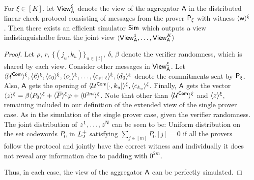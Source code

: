 \begin{lemma}\label{lem:distlincheckzk}
	For $\xi\in [K]$, let $\mathsf{View}^\xi_{\mathsf{A}}$ denote the view of the aggregator $\mathsf{A}$ in the distributed
	linear check protocol consisting of messages from the prover $\mathsf{P}_\xi$ with
	witness $\langle{\mathsf{w}}\rangle^\xi$. Then there exists an efficient simulator $\mathsf{Sim}$
	which outputs a view indistinguishalbe from the joint view $\langle
	\mathsf{View}^1_{\mathsf{A}},\ldots,\mathsf{View}^K_{\mathsf{A}}\rangle$ 
\end{lemma}
\begin{proof}
	
	Let  $\rho, \, r, \, \{(j_u,k_u)\}_{u\in[t]}, \, \delta, \, \beta$ denote the verifier
	randomness, which is shared by each view. Consider other messages in
	$\mathsf{View}^\xi_{\mathsf{A}}$. Let $\langle{\mathcal{U}^{\mathsf{Com}}}\rangle^\xi, \langle{\bm{\tilde{c}}}\rangle^\xi, \langle{c_0}\rangle^\xi, \langle{c_1}\rangle^\xi, \ldots, \langle{c_{s+\ell}}\rangle^\xi, \langle{d_0}\rangle^\xi$ 
	denote the commitments sent by $\mathsf{P}_\xi$. Also, $\mathsf{A}$ gets the opening of $\langle{\mathcal{U}^{\mathsf{Com}}[\cdot,k_u]}\rangle^\xi, \langle{c_{k_u}}\rangle^\xi$.
	Finally, $\mathsf{A}$ gets the vector $\langle{z}\rangle^\xi = \beta\langle{P_0}\rangle^\xi + \langle{\overline{P}}\rangle^\xi\varphi + \langle{0^{2m}}\rangle^\xi$.
	Note that other than $\langle{\mathcal{U}^{\mathsf{Com}}}\rangle^\xi$ and $\langle{z}\rangle^\xi$, remaining
	included in our definition of the extended view of the single prover case. As in the simulation of the
	single prover case, given the verifier randomness. The joint distribution of ${z}^1,\ldots,{z}^{\mathsf{N}}$ can be seen to be:
		Uniform distribution on the set codewords $P_0$ in $L^{+}_2$ satisfying
		$\sum_{j\in [m]}P_0[j]=0$ if all the provers follow the protocol and
		jointly have the correct witness and individually it does not reveal any information due to padding with $0^{2m}$.
	
	Thus, in each case, the view of the aggregator $\mathsf{A}$ can be perfectly simulated.
\end{proof}

